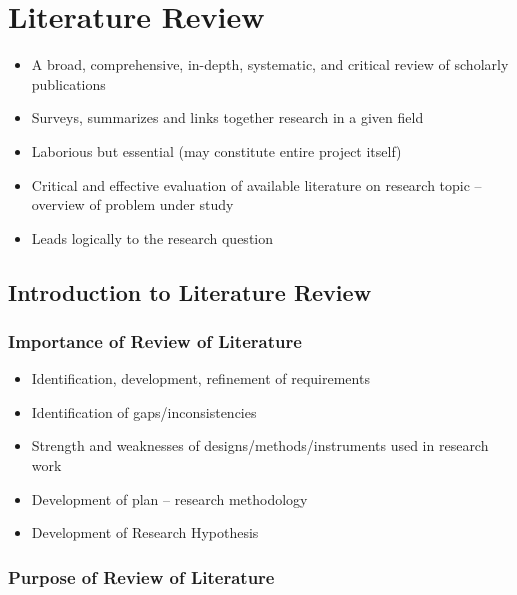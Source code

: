 \documentclass{article}
\begin{document}
\section{Literature Review}

\begin{itemize}
    \item A broad, comprehensive, in-depth, systematic, and critical
review of scholarly publications
    \item Surveys, summarizes and links together research in a given field
    \item Laborious but essential (may constitute entire project itself)
    \item Critical and effective evaluation of available literature on research topic -- overview of problem under study
    \item Leads logically to the research question
\end{itemize}

\subsection{Introduction to Literature Review}

\subsubsection{Importance of Review of Literature}

\begin{itemize}
    \item Identification, development, refinement of requirements
    \item Identification of gaps/inconsistencies
    \item Strength and weaknesses of designs/methods/instruments used in research work
    \item Development of plan -- research methodology
    \item Development of Research Hypothesis
\end{itemize}

\subsubsection{Purpose of Review of Literature}
\end{document}
